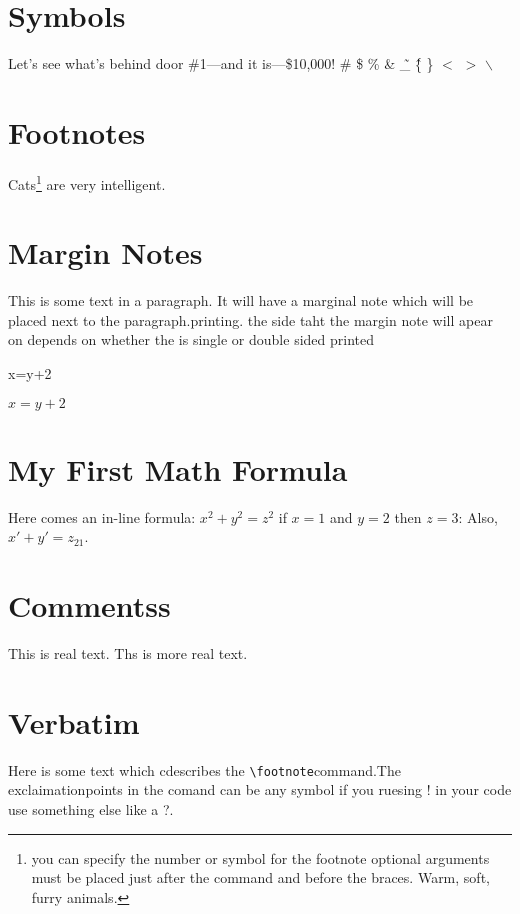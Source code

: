 \section{Symbols}
Let's see what's behind door \#1---and it is---\$10,000!
\# \$ \% \& \~ \_ \^ \{ \} $<$ $>$ $\backslash$
\section{Footnotes}
Cats\footnote[5]{you can specify the number or symbol for the footnote optional arguments must be placed just after the command and before the braces. Warm, soft, furry animals.} are very intelligent.
\section{Margin Notes}
This is some text in a paragraph. It will have a marginal note\normalmarginpar {} which will be placed next to the paragraph.printing.\reversemarginpar{} the side taht the margin note will apear on depends on whether the is single or double sided printed

x=y+2

$x=y+2$
\section {My First Math Formula}
Here comes an in-line formula: $x^2+y^2=z^2$
if $x=1$ and $y=2$ then $z=3$:
Also, $x'+y' =z_{21}$.

\section{Commentss}

This is real text. %
Ths is more real text.

\section{Verbatim}
Here is some text which cdescribes the \verb!\footnote!command.The exclaimationpoints in the comand can be any symbol if you ruesing ! in your code use something else like a ?.

